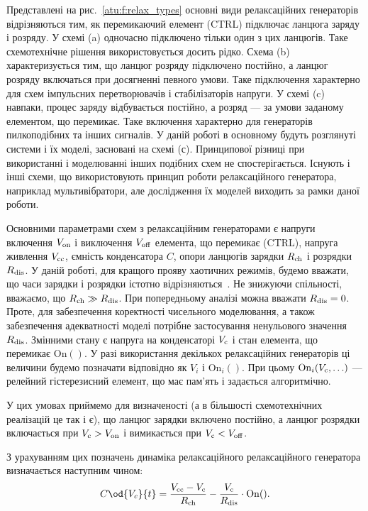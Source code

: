 Представлені на рис.~\ref{atu:f:relax_types} основні види релаксаційних
генераторів відрізняються тим, як перемикаючий елемент
(CTRL) підключає ланцюга заряду і розряду. У схемі (a)
одночасно підключено тільки один з цих ланцюгів. Таке
схемотехнічне рішення використовується досить рідко. Схема (b)
характеризується тим, що ланцюг розряду підключено постійно,
а ланцюг розряду включаться при досягненні певного умови. Таке
підключення характерно для схем імпульсних перетворювачів і
стабілізаторів напруги. У схемі (c) навпаки, процес заряду
відбувається постійно, а розряд --- за умови заданому
елементом, що перемикає. Таке включення характерно для
генераторів пилкоподібних та інших сигналів. У даній роботі в
основному будуть розглянуті системи і їх моделі, засновані на
схемі (с). Принципової різниці при використанні і моделюванні
інших подібних схем не спостерігається. Існують і інші схеми,
що використовують принцип роботи релаксаційного генератора,
наприклад мультивібратори, але дослідження їх моделей виходить
за рамки даної роботи.



Основними параметрами схем з релаксаційним генераторами є
напруги включення
$ V _\mathrm{on} $ і виключення
$ V _\mathrm{off} $ елемента, що перемикає (CTRL), напруга живлення
$ V _\mathrm{cc} $, ємність конденсатора
$ C $, опори ланцюгів зарядки
$ R _\mathrm{ch} $ і розрядки
$ R _\mathrm{dis} $. У даній роботі, для кращого прояву хаотичних
режимів, будемо вважати, що часи зарядки і розрядки істотно
відрізняються~\cite{atu_asau19}. Не знижуючи спільності, вважаємо, що
$ R _\mathrm{ch} \gg R _\mathrm{dis} $. При попередньому аналізі можна вважати
$ R _\mathrm{dis} = 0 $. Проте, для забезпечення коректності чисельного
моделювання, а також забезпечення адекватності моделі потрібне
застосування ненульового значення
$ R _\mathrm{dis} $. Змінними стану є напруга на конденсаторі
$ V _\mathrm{c} $ і стан елемента, що перемикає
$ \mathrm{On}()$. У разі використання декількох релаксаційних
генераторів ці величини будемо позначати відповідно як
$ V_{i} $ і
$ \mathrm{On}_{i}() $. При цьому
$ \mathrm{On}_{i}(V _\mathrm{c}, \ldots) $ --- релейний гістерезисний елемент, що
має пам'ять і задається алгоритмічно.

У цих умовах приймемо для визначеності (а в більшості
схемотехнічних реалізацій це так і є), що ланцюг зарядки включено
постійно, а ланцюг розрядки включається при
$ V _\mathrm{c}> V _\mathrm{on} $ і вимикається при
$ V _\mathrm{c} <V _\mathrm{off} $.

З урахуванням цих позначень динаміка релаксаційного релаксаційного
генератора визначається наступним чином:
%
\begin{equation}
  C \od{V_c}{t}
  =
  \frac{V\Tidx{cc} - V\Tidx{c}}{R\Tidx{ch}}
  - \frac{V\Tidx{c}}{R\Tidx{dis}} \cdot \mathrm{On}().
  \label{atu:eq:relax0}
\end{equation}

